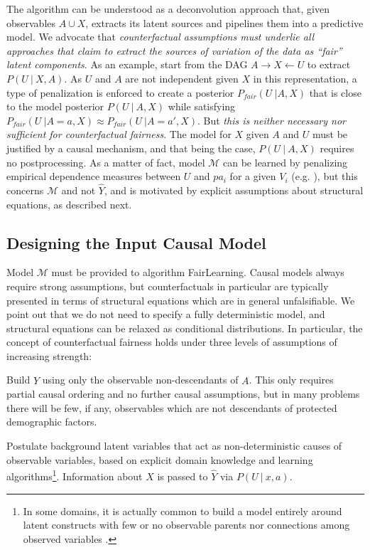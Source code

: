  The algorithm can be
understood as a deconvolution approach that, given observables $A \cup
X$, extracts its latent sources and pipelines them into a predictive
model. We advocate that \emph{counterfactual assumptions must underlie
  all approaches that claim to extract the sources of variation of the
  data as ``fair'' latent components}. As an example,
\citet{louizos2015variational} start from the DAG $A \rightarrow X
\leftarrow U$ to extract $P(U\ |\ X, A)$. As $U$ and $A$ are not
independent given $X$ in this representation, a type of penalization
is enforced to create a posterior $P_{fair}(U\ | A, X)$ that is close
to the model posterior $P(U\ |\ A, X)$ while satisfying $P_{fair}(U\ |
A = a, X) \approx P_{fair}(U\ | A = a', X)$. But {\it this is neither
  necessary nor sufficient for counterfactual fairness}. The model for
$X$ given $A$ and $U$ must be justified by a causal mechanism, and
that being the case, $P(U\ |\ A, X)$ requires no postprocessing. As a
matter of fact, model $\mathcal M$ can be learned by penalizing
empirical dependence measures between $U$ and $pa_i$ for a given $V_i$
(e.g. \citet{mooij:09}), but this concerns $\mathcal M$ and not $\hat Y$,
and is motivated by explicit assumptions about structural equations,
as described next.

\subsection{Designing the Input Causal Model}
\label{sec:limit-guide-model}

Model $\mathcal M$ must be provided to algorithm {\sc FairLearning}.
Causal models always require strong assumptions, but counterfactuals
in particular are typically presented in terms of structural equations
which are in general unfalsifiable. We point out that we do not need
to specify a fully deterministic model, and structural equations can
be relaxed as conditional distributions. In particular, the concept of
counterfactual fairness holds under three levels of assumptions of
increasing strength:

  Build $\hat Y$ using only the observable
non-descendants of $A$.  This only requires partial causal ordering
and no further causal assumptions, but in many problems there will be
few, if any, observables which are not descendants of protected
demographic factors.
  
 Postulate background latent variables that
act as non-deterministic causes of observable variables, based on
explicit domain knowledge and learning algorithms\footnote{In some
  domains, it is actually common to build a model entirely around
  latent constructs with few or no observable parents nor connections
  among observed variables \citep{bol:89}.}. Information about $X$ is
passed to $\hat Y$ via $P(U\ |\ x, a)$.

